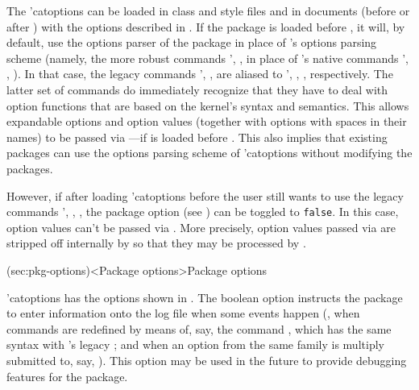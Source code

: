 \documentclass[
  use-a4-paper,
  use-10pt-font,
  final-version,
  use-UK-English,
  fancy-section-headings,
  frame-section-numbers,
  para-abstract-style,
  input-config-file,
  no-hyperref-messages
]{amltxdoc}
\begin{document}
The \pkg'{catoptions} can be loaded in class and style files and in documents (before or after \hx{\documentclass}) with the options described in . If the package is loaded before \hx{\documentclass}, it will, by default, use the options parser of the package in place of \latex's options parsing scheme (namely, the more robust commands \ffx'{\XDeclareOption, \XExecuteOptions, \XProcessOptions} in place of \latex's native commands \hhx'{\DeclareOption, \ExecuteOptions, \ProcessOptions}). In that case, the legacy commands \hhx'{\DeclareOption, \ExecuteOptions, \ProcessOptions} are aliased to \ffx'{\XDeclareOption, \XExecuteOptions, \XProcessOptions}, respectively. The latter set of commands do immediately recognize that they have to deal with option functions that are based on the kernel's syntax and semantics. This allows expandable options and option values (together with options with spaces in their names) to be passed via \hx{\documentclass}---if  is loaded before \hx{\documentclass}. This also implies that existing packages can use the options parsing scheme of \pkg'{catoptions} without modifying the packages.

However, if after loading \pkg'{catoptions} before \hx{\documentclass} the user still wants to use the legacy commands \hhx'{\DeclareOption, \ExecuteOptions, \ProcessOptions}, the package option  (see ) can be toggled to \texttt{false}. In this case, option values can't be passed via \hx{\documentclass}. More precisely, option values passed via \hx{\documentclass} are stripped off internally by  so that they may be processed by \hx{\ProcessOptions}.


\docsection(sec:pkg-options)<Package options>{Package options}

 \pkg'{catoptions} has the options shown in . The boolean option  instructs the package to enter information onto the log file when some events happen  (\eg, when commands are redefined by means of, say, the command \fx{\robust@redef}, which has the same syntax with  \tex's legacy \hx{\def}; and when an option from the same family is multiply submitted to, say, \fx{\XExecuteOptions}). This option may be used in the future to provide debugging features for the package.
\end{document}
